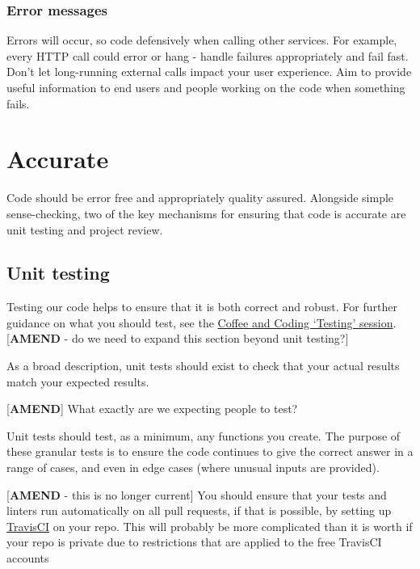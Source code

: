 \documentclass[]{book}
\begin{document}
\hypertarget{errors}{%
\subsection*{Error messages}\label{errors}}

Errors will occur, so code defensively when calling other services.
For example, every HTTP call could error or hang - handle failures appropriately and fail fast. Don't let long-running external calls impact your user experience. Aim to provide useful information to end users and people working on the code when something fails.

\hypertarget{accurate}{%
\chapter{Accurate}\label{accurate}}

Code should be error free and appropriately quality assured. Alongside simple sense-checking, two of the key mechanisms for ensuring that code is accurate are unit testing and project review.

\hypertarget{unittest}{%
\section{Unit testing}\label{unittest}}

Testing our code helps to ensure that it is both correct and robust. For further guidance on what you should test, see the \href{https://github.com/moj-analytical-services/coffee-and-coding-public/tree/master/2019-12-06\%20Testing\%20as\%20part\%20of\%20an\%20Analytical\%20Project}{Coffee and Coding `Testing' session}. {[}\textbf{AMEND} - do we need to expand this section beyond unit testing?{]}

As a broad description, unit tests should exist to check that your actual results match your expected results.

{[}\textbf{AMEND}{]} What exactly are we expecting people to test?

Unit tests should test, as a minimum, any functions you create. The purpose of these granular tests is to ensure the code continues to give the correct answer in a range of cases, and even in edge cases (where unusual inputs are provided).

{[}\textbf{AMEND} - this is no longer current{]}
You should ensure that your tests and linters run automatically on all pull requests, if that is possible, by setting up \href{https://travis-ci.org/}{TravisCI} on your repo. This will probably be more complicated than it is worth if your repo is private due to restrictions that are applied to the free TravisCI accounts
\end{document}

